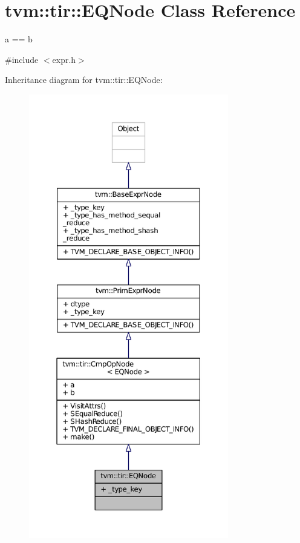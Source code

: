 \hypertarget{classtvm_1_1tir_1_1EQNode}{}\section{tvm\+:\+:tir\+:\+:E\+Q\+Node Class Reference}
\label{classtvm_1_1tir_1_1EQNode}


a == b  




{\ttfamily \#include $<$expr.\+h$>$}



Inheritance diagram for tvm\+:\+:tir\+:\+:E\+Q\+Node\+:
\nopagebreak
\begin{figure}[H]
\begin{center}
\leavevmode
\includegraphics[height=550pt]{classtvm_1_1tir_1_1EQNode__inherit__graph}
\end{center}
\end{figure}


